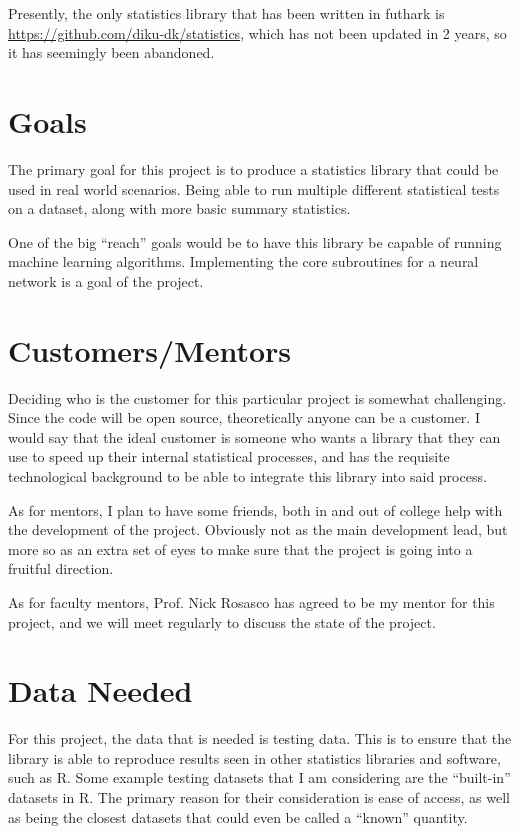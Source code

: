 \documentclass{article}
\begin{document}
Presently, the only statistics library that has been written in
futhark is \href{https://github.com/diku-dk/statistics}{https://github.com/diku-dk/statistics},
which has not been updated in 2 years, so it has seemingly been
abandoned.

\section{Goals}

The primary goal for this project is to produce a statistics library that
could be used in real world scenarios. Being able to run multiple different
statistical tests on a dataset, along with more basic summary statistics.

One of the big ``reach'' goals would be to have this library be capable of
running machine learning algorithms. Implementing the core subroutines for
a neural network is a goal of the project.

\section{Customers/Mentors}

Deciding who is the customer for this particular project is somewhat challenging.
Since the code will be open source, theoretically anyone can be a customer.
I would say that the ideal customer is someone who wants a library that they
can use to speed up their internal statistical processes, and has the requisite
technological background to be able to integrate this library into said process.

As for mentors, I plan to have some friends, both in and out of college help
with the development of the project. Obviously not as the main development lead,
but more so as an extra set of eyes to make sure that the project is going into
a fruitful direction.

As for faculty mentors, Prof. Nick Rosasco has agreed to be my mentor for this
project, and we will meet regularly to discuss the state of the project.

\section{Data Needed}

For this project, the data that is needed is testing data. This is to ensure
that the library is able to reproduce results seen in other statistics
libraries and software, such as R. Some example testing datasets that I am
considering are the ``built-in'' datasets in R. The primary reason for their
consideration is ease of access, as well as being the closest datasets that
could even be called a ``known'' quantity.
\end{document}
